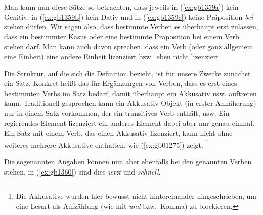 \begin{exe}
  \ex\label{ex:gb1359}
  \begin{xlist}
  \end{xlist}
\end{exe}

Man kann nun diese Sätze so betrachten, dass jeweils in (\ref{ex:gb1359a}) kein Genitiv, in (\ref{ex:gb1359b}) kein Dativ und in (\ref{ex:gb1359c}) keine Präposition \textit{bei} stehen dürfen.
Wir sagen also, dass bestimmte Verben es überhaupt erst zulassen, dass ein bestimmter Kasus oder eine bestimmte Präposition bei einem Verb stehen darf.
Man kann auch davon sprechen, dass ein Verb (oder ganz allgemein eine Einheit) eine andere Einheit lizenziert bzw.\ eben nicht lizenziert.


Die Struktur, auf die sich die Definition bezieht, ist für unsere Zwecke zunächst ein Satz.
Konkret heißt das \zB für Ergänzungen von Verben, dass es erst eines bestimmten Verbs im Satz bedarf, damit überhaupt ein Akkusativ usw. auftreten kann.
Traditionell gesprochen kann ein Akkusativ-Objekt (in erster Annäherung) nur in einem Satz vorkommen, der ein transitives Verb enthält, usw.
Ein regierendes Element lizenziert ein anderes Element dabei aber nur genau einmal.
Ein Satz mit einem Verb, das einen Akkusativ lizenziert, kann nicht ohne weiteres mehrere Akkusative enthalten, wie (\ref{ex:gb01275}) zeigt.%
\footnote{Die Akkusative wurden hier bewusst nicht hintereinander hingeschrieben, um eine Lesart als Aufzählung (wie mit \textit{und} bzw.\ Komma) zu blockieren.}

\begin{exe}
  \ex\label{ex:gb01275}
  \begin{xlist}
  \end{xlist}
\end{exe}

Die sogenannten Angaben können nun aber ebenfalls bei den genannten Verben stehen, in (\ref{ex:gb1360}) sind dies \textit{jetzt} und \textit{schnell}.

